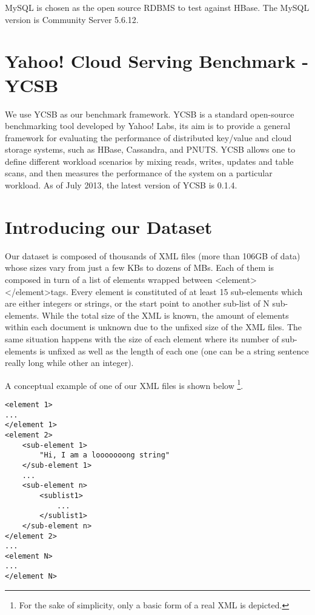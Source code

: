 MySQL \cite{MySQL} is chosen as the open source RDBMS to test against HBase. The MySQL version is Community Server 5.6.12.

\section{Yahoo! Cloud Serving Benchmark - YCSB}

We use YCSB as our benchmark framework. YCSB\cite{cooper2010benchmarking} is a standard open-source benchmarking tool developed by Yahoo! Labs, its aim is to provide a general framework for evaluating the performance of distributed key/value and cloud storage systems, such as HBase, Cassandra, and PNUTS. YCSB allows one to define different workload scenarios by mixing reads, writes, updates and table scans, and then measures the performance of the system on a particular workload. As of July 2013, the latest version of YCSB is 0.1.4.

\section{Introducing our Dataset}

Our dataset is composed of thousands of XML files (more than 106GB of data) whose sizes vary from just a few KBs to dozens of MBs. Each of them is composed in turn of a list of elements wrapped between \textless element\textgreater\textless /element\textgreater tags. Every element is constituted of at least 15 sub-elements which are either integers or strings, or the start point to another sub-list of N sub-elements. While the total size of the XML is known, the amount of elements within each document is unknown due to the unfixed size of the XML files. The same situation happens with the size of each element where its number of sub-elements is unfixed as well as the length of each one (one can be a string sentence really long while other an integer). 
\par
A conceptual example of one of our XML files is shown below \footnote{For the sake of simplicity, only a basic form of a real XML is depicted.}.

\lstset{language=XML, basicstyle=\footnotesize, numbers=left, breaklines=true}
\begin{lstlisting}
<element 1>
...
</element 1>
<element 2>
	<sub-element 1>
		"Hi, I am a looooooong string"
	</sub-element 1>
	...
	<sub-element n>
		<sublist1>
			...
		</sublist1>
	</sub-element n>
</element 2>
...
<element N>
...
</element N>
\end{lstlisting}

